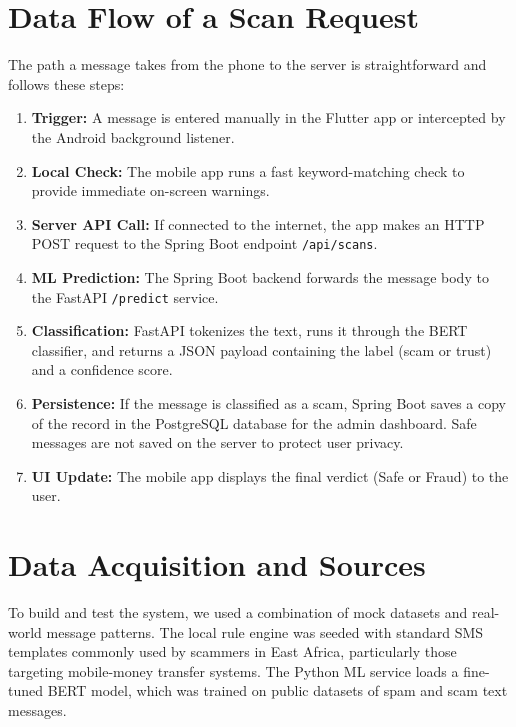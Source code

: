 \section{Data Flow of a Scan Request}
The path a message takes from the phone to the server is straightforward and follows these steps:
\begin{enumerate}
  \item \textbf{Trigger:} A message is entered manually in the Flutter app or intercepted by the Android background listener.
  \item \textbf{Local Check:} The mobile app runs a fast keyword-matching check to provide immediate on-screen warnings.
  \item \textbf{Server API Call:} If connected to the internet, the app makes an HTTP POST request to the Spring Boot endpoint \texttt{/api/scans}.
  \item \textbf{ML Prediction:} The Spring Boot backend forwards the message body to the FastAPI \texttt{/predict} service.
  \item \textbf{Classification:} FastAPI tokenizes the text, runs it through the BERT classifier, and returns a JSON payload containing the label (scam or trust) and a confidence score.
  \item \textbf{Persistence:} If the message is classified as a scam, Spring Boot saves a copy of the record in the PostgreSQL database for the admin dashboard. Safe messages are not saved on the server to protect user privacy.
  \item \textbf{UI Update:} The mobile app displays the final verdict (Safe or Fraud) to the user.
\end{enumerate}

\section{Data Acquisition and Sources}
To build and test the system, we used a combination of mock datasets and real-world message patterns. The local rule engine was seeded with standard SMS templates commonly used by scammers in East Africa, particularly those targeting mobile-money transfer systems. The Python ML service loads a fine-tuned BERT model, which was trained on public datasets of spam and scam text messages.

